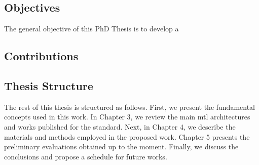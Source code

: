 \subsection{Objectives}	

The general objective of this PhD Thesis is to develop a 

\subsection{Contributions}	

\subsection{Thesis Structure}

The rest of this thesis is structured as follows. First, we present the fundamental concepts used in this work. In Chapter 3, we review the main \acl{mtl} architectures and works published for the \icao standard. Next, in Chapter 4, we describe the materials and methods employed in the proposed work. Chapter 5 presents the preliminary evaluations obtained up to the moment. Finally, we discuss the conclusions and propose a schedule for future works.

